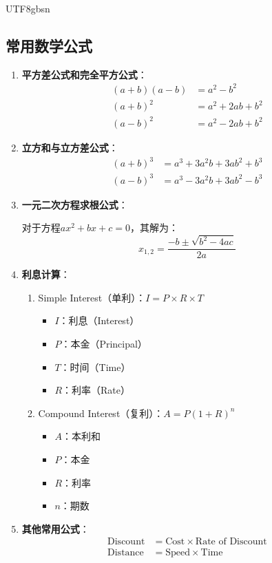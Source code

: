 \documentclass[12pt]{article}
\begin{document}
\begin{CJK*}{UTF8}{gbsn}
\subsection{常用数学公式}
\begin{enumerate}
    \item \textbf{平方差公式和完全平方公式}：
    \begin{align*}
        (a+b)(a-b) &= a^2 - b^2 \\
        (a+b)^2 &= a^2 + 2ab + b^2 \\
        (a-b)^2 &= a^2 - 2ab + b^2
    \end{align*}
    
    \item \textbf{立方和与立方差公式}：
    \begin{align*}
        (a+b)^3 &= a^3 + 3a^2b + 3ab^2 + b^3 \\
        (a-b)^3 &= a^3 - 3a^2b + 3ab^2 - b^3
    \end{align*}
    
    \item \textbf{一元二次方程求根公式}：
    
    对于方程$ax^2 + bx + c = 0$，其解为：
    $$x_{1,2} = \frac{-b \pm \sqrt{b^2 - 4ac}}{2a}$$
    
    \item \textbf{利息计算}：
    \begin{enumerate}
        \item Simple Interest（单利）：$I = P \times R \times T$
        \begin{itemize}
            \item $I$：利息（Interest）
            \item $P$：本金（Principal）
            \item $T$：时间（Time）
            \item $R$：利率（Rate）
        \end{itemize}
        \item Compound Interest（复利）：$A = P(1+R)^n$
        \begin{itemize}
            \item $A$：本利和
            \item $P$：本金
            \item $R$：利率
            \item $n$：期数
        \end{itemize}
    \end{enumerate}
    
    \item \textbf{其他常用公式}：
    \begin{align*}
        \text{Discount} &= \text{Cost} \times \text{Rate of Discount} \\
        \text{Distance} &= \text{Speed} \times \text{Time}
    \end{align*}
    

\end{enumerate}
\end{CJK*}
\end{document}
